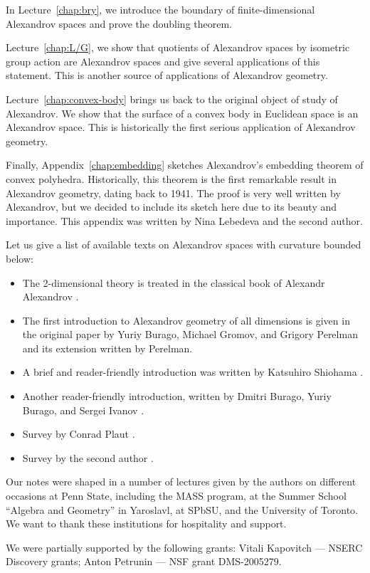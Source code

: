 In Lecture~\ref{chap:bry}, we introduce the boundary of finite-dimensional Alexandrov spaces and prove the doubling theorem.

Lecture~\ref{chap:L/G}, we show that quotients of Alexandrov spaces by isometric group action are Alexandrov spaces and give several applications of this statement.
This is another source of applications of Alexandrov geometry.

Lecture~\ref{chap:convex-body} brings us back to the original object of study of Alexandrov.
We show that the surface of a convex body in Euclidean space is an Alexandrov space.
This is historically the first serious application of Alexandrov geometry.

Finally, Appendix~\ref{chap:embedding} sketches Alexandrov's embedding theorem of convex polyhedra.
Historically, this theorem is the first remarkable result in Alexandrov geometry, dating back to 1941.
The proof is very well written by Alexandrov, but we decided to include its sketch here due to its beauty and importance.
This appendix was written by Nina Lebedeva and the second author.

Let us give a list of available texts on Alexandrov spaces with curvature bounded below: 
\begin{itemize}
\item The 2-dimensional theory is treated in the classical book of Alexandr Alexandrov \cite{alexandrov-1948}.
\item The first introduction to Alexandrov geometry of all dimensions is given in the original paper by Yuriy Burago, Michael Gromov, and Grigory Perelman \cite{burago-gromov-perelman} 
and its extension \cite{perelman1991} written by Perelman.
\item A brief and reader-friendly introduction was written by Katsuhiro Shiohama \cite[Sections 1--8]{shiohama}.
\item Another reader-friendly introduction, written by Dmitri Burago, Yuriy
Burago, and Sergei Ivanov \cite[Chapter 10]{burago-burago-ivanov}.
\item Survey by Conrad Plaut \cite{plaut:survey}.
\item Survey by the second author \cite{petrunin:survey}.
\end{itemize}

Our notes were shaped in a number of lectures given by the authors
on different occasions at Penn State, including the MASS program,
at the Summer School ``Algebra and Geometry'' in Yaroslavl,
at SPbSU,
and the University of Toronto.
We want to thank these institutions for hospitality and support.

We were partially supported by the following grants:
Vitali Kapovitch ---   NSERC Discovery grants;
Anton Petrunin --- 
NSF grant DMS-2005279. %


